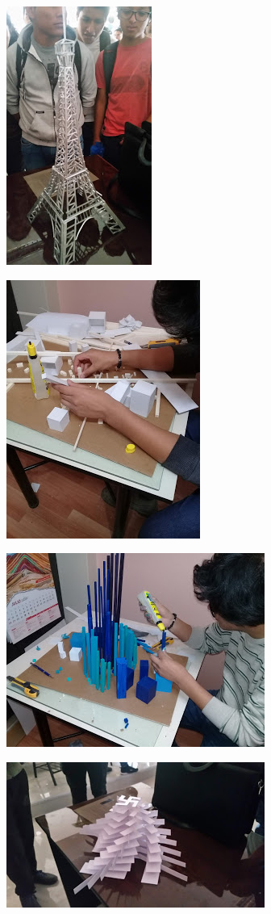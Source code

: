 \documentclass[12pt,]{report}
\begin{document}
\includegraphics{r2.jpg}

\includegraphics{rrr.jpg}

\includegraphics{rrrr.jpg}

\includegraphics{rrrrr.jpg}
\end{document}
